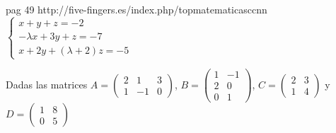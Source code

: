 \documentclass[addpoints,spanish, 12pt,a4paper]{exam}
\begin{document}
\begin{questions}

 pag 49 http://five-fingers.es/index.php/topmatematicasccnn \\
$\left\{\begin{matrix} x+y+z  =  -2 \\
-\lambda x + 3y +z  =  -7 \\
x + 2y  + (\lambda +2)z  = -5 
\end{matrix}\right.
$

\question Dadas las matrices  $A=\left(\begin{matrix}2 & 1 & 3\\1 & -1 & 0\end{matrix}\right)$,  $B=\left(\begin{matrix}1 & -1\\2 & 0\\0 & 1\end{matrix}\right)$, $C=\left(\begin{matrix}2 & 3\\1 & 4\end{matrix}\right)$ y $D=\left(\begin{matrix}1 & 8\\0 & 5\end{matrix}\right)$ 

\end{questions}
\end{document}
